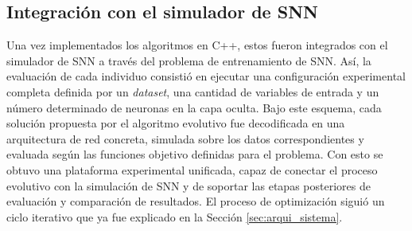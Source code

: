 \subsection{Integración con el simulador de SNN}
Una vez implementados los algoritmos en C++, estos fueron integrados con el simulador de SNN a través del problema de entrenamiento de SNN. Así, la evaluación de cada individuo consistió en ejecutar una configuración experimental completa definida por un \textit{dataset}, una cantidad de variables de entrada y un número determinado de neuronas en la capa oculta. Bajo este esquema, cada solución propuesta por el algoritmo evolutivo fue decodificada en una arquitectura de red concreta, simulada sobre los datos correspondientes y evaluada según las funciones objetivo definidas para el problema. Con esto se obtuvo una plataforma experimental unificada, capaz de conectar el proceso evolutivo con la simulación de SNN y de soportar las etapas posteriores de evaluación y comparación de resultados. El proceso de optimización siguió un ciclo iterativo que ya fue explicado en la Sección \ref{sec:arqui_sistema}.



